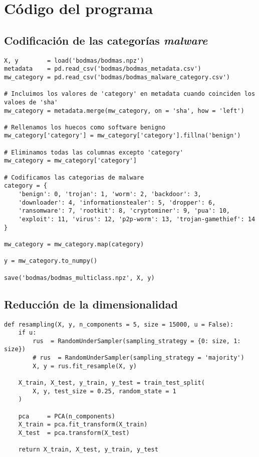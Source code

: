 \chapter{Código del programa}


\section{Codificación de las categorías \textit{malware}}
\label{sec:codificacion}

\lstset{style=codestyle, language=Python}
\begin{lstlisting}[frame=single]
X, y        = load('bodmas/bodmas.npz')
metadata    = pd.read_csv('bodmas/bodmas_metadata.csv')
mw_category = pd.read_csv('bodmas/bodmas_malware_category.csv')

# Incluimos los valores de 'category' en metadata cuando coinciden los valoes de 'sha'
mw_category = metadata.merge(mw_category, on = 'sha', how = 'left')

# Rellenamos los huecos como software benigno
mw_category['category'] = mw_category['category'].fillna('benign')

# Eliminamos todas las columnas excepto 'category'
mw_category = mw_category['category']

# Codificamos las categorias de malware
category = {
	'benign': 0, 'trojan': 1, 'worm': 2, 'backdoor': 3,
	'downloader': 4, 'informationstealer': 5, 'dropper': 6,
	'ransomware': 7, 'rootkit': 8, 'cryptominer': 9, 'pua': 10,
	'exploit': 11, 'virus': 12, 'p2p-worm': 13, 'trojan-gamethief': 14
}

mw_category = mw_category.map(category)

y = mw_category.to_numpy()

save('bodmas/bodmas_multiclass.npz', X, y)

\end{lstlisting}

\section{Reducción de la dimensionalidad}
\label{sec:red_dim}

\lstset{style=codestyle, language=Python}
\begin{lstlisting}[frame=single]
def resampling(X, y, n_components = 5, size = 15000, u = False):
	if u:
		rus  = RandomUnderSampler(sampling_strategy = {0: size, 1: size})
		# rus  = RandomUnderSampler(sampling_strategy = 'majority')
		X, y = rus.fit_resample(X, y)

	X_train, X_test, y_train, y_test = train_test_split(
		X, y, test_size = 0.25, random_state = 1
	)

	pca     = PCA(n_components)
	X_train = pca.fit_transform(X_train)
	X_test  = pca.transform(X_test)

	return X_train, X_test, y_train, y_test
\end{lstlisting}

